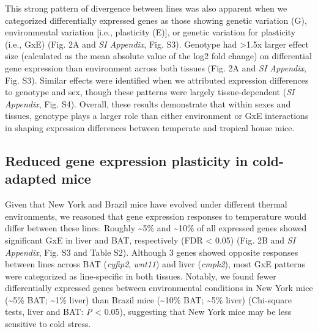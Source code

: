 \documentclass[9pt,twocolumn,twoside,lineno]{pnas-new}
\begin{document}
This strong pattern of divergence between lines was also apparent when
we categorized differentially expressed genes as those showing genetic
variation (G), environmental variation {[}i.e., plasticity (E){]}, or
genetic variation for plasticity (i.e., GxE) (Fig. 2A and \emph{SI
Appendix}, Fig. S3). Genotype had \textgreater1.5x larger effect size
(calculated as the mean absolute value of the log2 fold change) on
differential gene expression than environment across both tissues (Fig.
2A and \emph{SI Appendix}, Fig. S3). Similar effects were identified
when we attributed expression differences to genotype and sex, though
these patterns were largely tissue-dependent (\emph{SI Appendix}, Fig.
S4). Overall, these results demonstrate that within sexes and tissues,
genotype plays a larger role than either environment or GxE interactions
in shaping expression differences between temperate and tropical house
mice.

\hypertarget{reduced-gene-expression-plasticity-in-cold-adapted-mice}{%
\subsection*{Reduced gene expression plasticity in cold-adapted
mice}\label{reduced-gene-expression-plasticity-in-cold-adapted-mice}}

Given that New York and Brazil mice have evolved under different thermal
environments, we reasoned that gene expression responses to temperature
would differ between these lines. Roughly \textasciitilde5\% and
\textasciitilde10\% of all expressed genes showed significant GxE in
liver and BAT, respectively (FDR \textless{} 0.05) (Fig. 2B and \emph{SI
Appendix}, Fig. S3 and Table S2). Although 3 genes showed opposite
responses between lines across BAT (\emph{cyfip2}, \emph{wnt11}) and
liver (\emph{cmpk2}), most GxE patterns were categorized as
line-specific in both tissues. Notably, we found fewer differentially
expressed genes between environmental conditions in New York mice
(\textasciitilde5\% BAT; \textasciitilde1\% liver) than Brazil mice
(\textasciitilde10\% BAT; \textasciitilde5\% liver) (Chi-square tests,
liver and BAT: \emph{P} \textless{} 0.05), suggesting that New York mice
may be less sensitive to cold stress.
\end{document}
